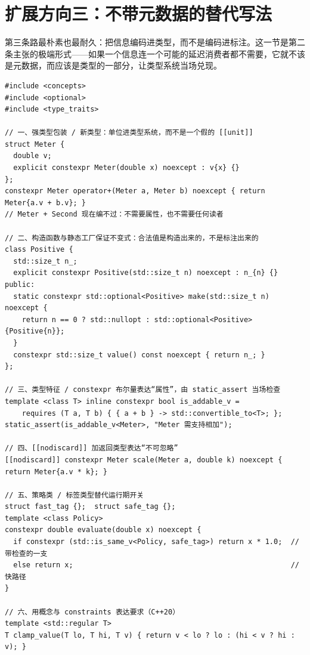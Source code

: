 \documentclass[12pt,a4paper,fontset=fandol]{ctexbook}
\newcommand{\cpplabel}{%
  \tcbox[on line,colback=cppheadbg,colframe=cppheadbg,
    boxrule=0pt,arc=1pt,left=2pt,right=2pt,top=1pt,bottom=1pt,
    colupper=white,fontupper=\scriptsize\bfseries]{C++}}
\begin{document}
\section{扩展方向三：不带元数据的替代写法}
\label{sec:three-ext-alt}

第三条路最朴素也最耐久：把信息编码进类型，而不是编码进标注。这一节是第二条主张的极端形式——如果一个信息连一个可能的延迟消费者都不需要，它就不该是元数据，而应该是类型的一部分，让类型系统当场兑现。

\cpplabel
\begin{lstlisting}[style=cppstyle,caption={六种把信息搬进类型系统的写法：约束进类型、不变式进构造路径、开关进标签类型},label={lst:ch3-cpp-nometa}]
#include <concepts>
#include <optional>
#include <type_traits>

// 一、强类型包装 / 新类型：单位进类型系统，而不是一个假的 [[unit]]
struct Meter {
  double v;
  explicit constexpr Meter(double x) noexcept : v{x} {}
};
constexpr Meter operator+(Meter a, Meter b) noexcept { return Meter{a.v + b.v}; }
// Meter + Second 现在编不过：不需要属性，也不需要任何读者

// 二、构造函数与静态工厂保证不变式：合法值是构造出来的，不是标注出来的
class Positive {
  std::size_t n_;
  explicit constexpr Positive(std::size_t n) noexcept : n_{n} {}
public:
  static constexpr std::optional<Positive> make(std::size_t n) noexcept {
    return n == 0 ? std::nullopt : std::optional<Positive>{Positive{n}};
  }
  constexpr std::size_t value() const noexcept { return n_; }
};

// 三、类型特征 / constexpr 布尔量表达“属性”，由 static_assert 当场检查
template <class T> inline constexpr bool is_addable_v =
    requires (T a, T b) { { a + b } -> std::convertible_to<T>; };
static_assert(is_addable_v<Meter>, "Meter 需支持相加");

// 四、[[nodiscard]] 加返回类型表达“不可忽略”
[[nodiscard]] constexpr Meter scale(Meter a, double k) noexcept { return Meter{a.v * k}; }

// 五、策略类 / 标签类型替代运行期开关
struct fast_tag {};  struct safe_tag {};
template <class Policy>
constexpr double evaluate(double x) noexcept {
  if constexpr (std::is_same_v<Policy, safe_tag>) return x * 1.0;  // 带检查的一支
  else return x;                                                   // 快路径
}

// 六、用概念与 constraints 表达要求（C++20）
template <std::regular T>
T clamp_value(T lo, T hi, T v) { return v < lo ? lo : (hi < v ? hi : v); }
\end{lstlisting}
\end{document}

